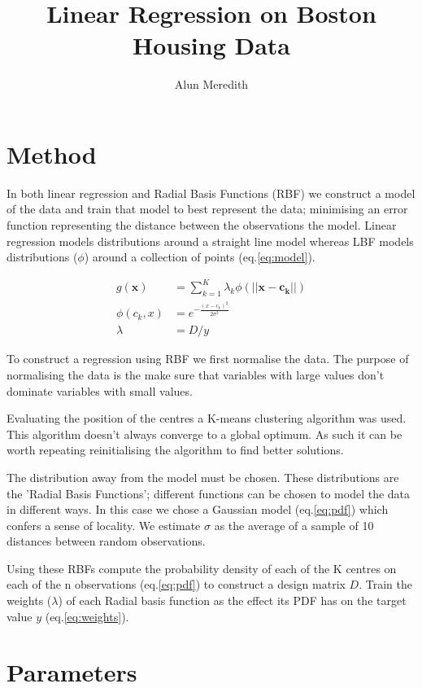 \documentclass[a4paper,10pt, twocolumn]{article}
\begin{document}
\title{Linear Regression on Boston Housing Data}
\author{Alun Meredith}
\maketitle

\section{Method}
In both linear regression and Radial Basis Functions (RBF) we construct a model of the data and train that model to best represent the data; minimising an error function representing the distance between the observations the model. Linear regression models distributions around a straight line model whereas LBF models distributions ($\phi$)  around a collection of points (eq.\ref{eq:model}).

\begin{align}
	\label{eq:model}	
	g(\mathbf{x}) &= \sum_{k=1}^K\lambda_k\phi(||\mathbf{x-c_k}||)\\
	\label{eq:pdf}
	\phi(c_k,x) &= e^{{-\frac{(x-c_k)^2}{2\sigma^2}}}\\
	\label{eq:weights}
	\lambda &= D / y
\end{align} 

To construct a regression using RBF we first normalise the data. The purpose of normalising the data is the make sure that variables with large values don't dominate variables with small values. 

Evaluating the position of the centres a K-means clustering algorithm was used. This algorithm doesn't always converge to a global optimum. As such it can be worth repeating reinitialising the algorithm to find better solutions.

The distribution away from the model must be chosen. These distributions are the 'Radial Basis Functions'; different functions can be chosen to model the data in different ways. In this case we chose a Gaussian model (eq.\ref{eq:pdf}) which confers a sense of locality. We estimate $\sigma$ as the average of a sample of 10 distances between random observations.

Using these RBFs compute the probability density of each of the K centres on each of the n observations (eq.\ref{eq:pdf}) to construct a design matrix $D$. Train the weights ($\lambda$) of each Radial basis function as the effect its PDF has on the target value $y$ (eq.\ref{eq:weights}).
\section{Parameters}
\end{document}
